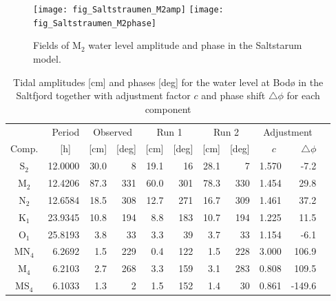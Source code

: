 \begin{figure}[!t]
\centering
\texttt{[image: fig\_Saltstraumen\_M2amp]}
\texttt{[image: fig\_Saltstraumen\_M2phase]}
\caption{Fields of M$_2$ water level amplitude and phase in the Saltstarum model.}
\label{fig:Saltstraumen_field}
\end{figure}

\begin{table}[ht]
\caption{Tidal amplitudes [cm] and phases [deg] for the water level at Bod{\o} in the Saltfjord together with adjustment factor $c$ and phase shift $\triangle \phi$ for each component}
\label{tab:Bodo}
\centering
\begin{tabular}{crrrrrrrrrr} \hline
      & Period & \multicolumn{2}{c}{Observed} & \multicolumn{2}{c}{Run 1} & \multicolumn{2}{c}{Run 2} & \multicolumn{2}{c}{Adjustment} \\
Comp. & [h] $\;\;$ & [cm] & [deg] & [cm] & [deg] & [cm] & [deg] & $c\;\;$ & $\triangle \phi$  \\ \hline 
S$_2$   & 12.0000  &  30.0 &      8   &  19.1 &     16   &  28.1 &      7    &   1.570  &    -7.2   \\ 
M$_2$   & 12.4206  &  87.3 &    331   &  60.0 &    301   &  78.3 &    330    &   1.454  &    29.8   \\ 
N$_2$   & 12.6584  &  18.5 &    308   &  12.7 &    271   &  16.7 &    309    &   1.461  &    37.2   \\ 
K$_1$   & 23.9345  &  10.8 &    194   &   8.8 &    183   &  10.7 &    194    &   1.225  &    11.5   \\ 
O$_1$   & 25.8193  &   3.8 &     33   &   3.3 &     39   &   3.7 &     33    &   1.154  &    -6.1   \\ 
MN$_4$  &  6.2692  &   1.5 &    229   &   0.4 &    122   &   1.5 &    228    &   3.000  &   106.9   \\ 
M$_4$   &  6.2103  &   2.7 &    268   &   3.3 &    159   &   3.1 &    283    &   0.808  &   109.5   \\ 
MS$_4$  &  6.1033  &   1.3 &      2   &   1.5 &    152   &   1.4 &     30    &   0.861  &  -149.6   \\ \hline
\end{tabular}
\end{table}

